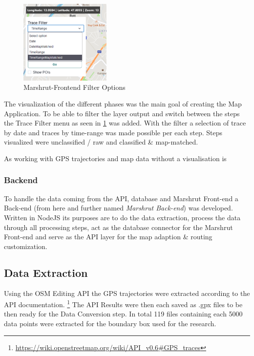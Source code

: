 \begin{figure}[!ht]
  \centering
  \includegraphics[width=0.4\textwidth]{images/MapApplicationFilterOptions.png}
  \caption{
  Marshrut-Frontend Filter Options
  }
  \label{figure:FilterOptions}
\end{figure}

The visualization of the different phases was the main goal of creating the Map Application. To be able to filter the layer output and switch between the steps the Trace Filter menu as seen in \ref{figure:FilterOptions} was added. With the filter a selection of trace by date and traces by time-range was made possible per each step. Steps visualized were unclassified / raw and classified & map-matched. 

As working with GPS trajectories and map data without a visualisation is 

\subsubsection{Backend}

To handle the data coming from the API, database and Marshrut Front-end a Back-end (from here and further named \textit{Marshrut Back-end}) was developed. Written in NodeJS its purposes are to do the data extraction, process the data through all processing steps, act as the database connector for the Marshrut Front-end and serve as the API layer for the map adaption & routing customization.

\subsection{Data Extraction}

Using the OSM Editing API the GPS trajectories were extracted according to the API documentation. \footnote{\url{https://wiki.openstreetmap.org/wiki/API_v0.6#GPS_traces}} The API Results were then each saved as .gpx files to be then ready for the Data Conversion step. In total 119 files containing each 5000 data points were extracted for the boundary box used for the research.


